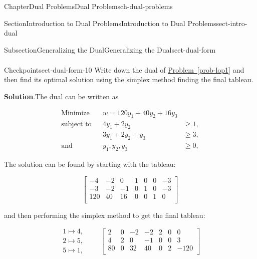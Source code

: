 \documentclass[oneside,10pt,]{book}
\newcommand{\blocktitlefont}{\relax}
\newcommand{\xreffont}{\relax}
\numberwithin{equation}{section}
\newcommand{\amp}{&}
\begin{document}
\begin{chapterptx}{Chapter}{Dual Problems}{}{Dual Problems}{}{}{ch-dual-problems}
\begin{sectionptx}{Section}{Introduction to Dual Problems}{}{Introduction to Dual Problems}{}{}{sect-intro-dual}
\begin{subsectionptx}{Subsection}{Generalizing the Dual}{}{Generalizing the Dual}{}{}{sect-dual-form}
\begin{equation}
\begin{aligned}
\end{aligned}\label{eq-dual-matrix}
\end{equation}
%
\begin{inlineexercise}{Checkpoint}{}{sect-dual-form-10}%
Write down the dual of \hyperref[prob-lop1]{Problem~{\xreffont\ref{prob-lop1}}} and then find its optimal solution using the simplex method finding the final tableau.%
\par\smallskip%
\noindent\textbf{\blocktitlefont Solution}.\hypertarget{sect-dual-form-10-2}{}\quad{}The dual can be written as%
\par
%
\begin{equation*}
\begin{aligned} \text{Minimize} \amp \amp w =  120 y_1 + 40 y_2 + 16 y_3 \amp \\ \text{subject to} \amp \amp  4y_1 + 2 y_2 \amp \geq 1, \\ \amp \amp  3y_1 + 2 y_2 + y_3 \amp \geq 3, \\ \text{and} \amp \amp y_1, y_2, y_3 \amp \geq 0, \end{aligned}
\end{equation*}
%
\par
The solution can be found by starting with the tableau:%
\par
%
\begin{equation*}
\left[\begin{array}{rrr|rrr|r} -4 \amp -2 \amp 0 \amp 1 \amp 0 \amp 0 \amp -3\\ -3 \amp -2 \amp -1 \amp 0 \amp 1 \amp 0 \amp -3\\ \hline 120 \amp 40 \amp 16 \amp 0 \amp 0 \amp 1 \amp 0\\ \end{array} \right]
\end{equation*}
%
\par
and then performing the simplex method to get the final tableau:%
\par
%
\begin{equation*}
\begin{array}{r} 1 \mapsto 4, \\ 2 \mapsto 5, \\ 5 \mapsto 1, \end{array} \qquad \left[\begin{array}{rrr|rrr|r} 2 \amp 0 \amp -2 \amp -2 \amp 2 \amp 0 \amp 0\\ 4 \amp 2 \amp 0 \amp -1 \amp 0 \amp 0 \amp 3\\ \hline 80 \amp 0 \amp 32 \amp 40 \amp 0 \amp 2 \amp -120\\ \end{array} \right]

\end{equation*}
\end{inlineexercise}
\end{subsectionptx}
\end{sectionptx}
\end{chapterptx}
\end{document}
